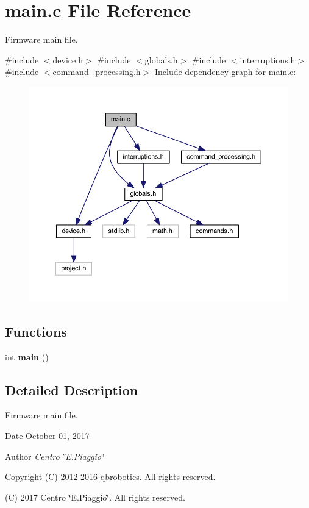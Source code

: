 \section{main.\+c File Reference}
\label{main_8c}


Firmware main file.  


{\ttfamily \#include $<$device.\+h$>$}\newline
{\ttfamily \#include $<$globals.\+h$>$}\newline
{\ttfamily \#include $<$interruptions.\+h$>$}\newline
{\ttfamily \#include $<$command\+\_\+processing.\+h$>$}\newline
Include dependency graph for main.\+c\+:\nopagebreak
\begin{figure}[H]
\begin{center}
\leavevmode
\includegraphics[width=350pt]{main_8c__incl}
\end{center}
\end{figure}
\subsection*{Functions}
\begin{DoxyCompactItemize}
\item 
\mbox{\label{main_8c_ae66f6b31b5ad750f1fe042a706a4e3d4}} 
int {\bfseries main} ()
\end{DoxyCompactItemize}


\subsection{Detailed Description}
Firmware main file. 

\begin{DoxyDate}{Date}
October 01, 2017 
\end{DoxyDate}
\begin{DoxyAuthor}{Author}
{\itshape Centro \char`\"{}\+E.\+Piaggio\char`\"{}} 
\end{DoxyAuthor}
\begin{DoxyCopyright}{Copyright}
(C) 2012-\/2016 qbrobotics. All rights reserved. 

(C) 2017 Centro \char`\"{}\+E.\+Piaggio\char`\"{}. All rights reserved. 
\end{DoxyCopyright}
